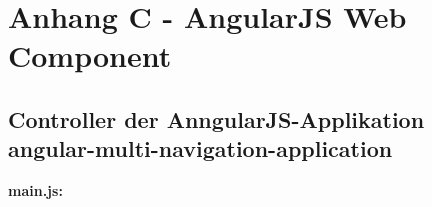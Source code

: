 \chapter*{Anhang C - AngularJS Web Component}\label{anhang-c---angularjs-web-component}

\section*{Controller der AnngularJS-Applikation angular-multi-navigation-application}\label{controller-der-angular-multi-navigation-application}

\textbf{main.js:}

\begin{Shaded}
\begin{Highlighting}[]
\OperatorTok{;}


\end{Highlighting}
\end{Shaded}
